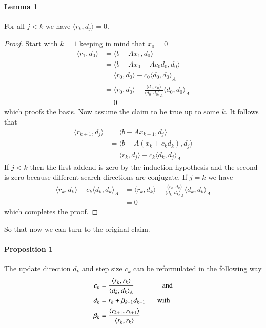 \documentclass[preprint,12pt,3p]{elsarticle}
\begin{document}
\paragraph{Lemma 1}
For all $j<k$ we have $\langle r_{k},d_j\rangle=0$.
\begin{proof}
Start with $k=1$ keeping in mind that $x_0=0$
\begin{align*}
    \langle r_{1},d_0\rangle&=\langle b-Ax_{1},d_0\rangle\\
    &=\langle b-Ax_0-Ac_0d_0,d_0\rangle\\
    &=\langle r_0,d_0\rangle-c_0\langle d_0,d_0\rangle_A\\
    &=\langle r_0,d_0\rangle-\frac{\langle d_0, r_0\rangle}{\langle d_0,d_0\rangle_A}\langle d_0,d_0\rangle_A\\
    &=0
\end{align*}
which proofs the basis. Now assume the claim to be true up to some $k$. It follows that
\begin{align*}
    \langle r_{k+1},d_j\rangle&=\langle b-Ax_{k+1},d_j\rangle\\
    &=\langle b-A(x_k+c_kd_k),d_j\rangle\\
    &=\langle r_k,d_j\rangle - c_k\langle d_k,d_j\rangle_A 
\end{align*}
If $j<k$ then the first addend is zero by the induction hypothesis and the second is zero because different search directions are conjugate. If $j=k$ we have
\begin{align*}
    \langle r_k,d_k\rangle - c_k\langle d_k,d_k\rangle_A&=\langle r_k,d_k\rangle - \frac{\langle r_k,d_k\rangle}{\langle d_k,d_k\rangle_A}\langle d_k,d_k\rangle_A\\
    &=0
\end{align*}
which completes the proof. 
\end{proof}

\noindent
So that now we can turn to the original claim.

\paragraph{Proposition 1} The update direction $d_k$ and step size $c_k$ can be reformulated in the following way
\begin{align*}
    c_k&=\frac{\langle r_k,r_k\rangle}{\langle d_k,d_k\rangle_A}\hspace{1.3 cm}\mbox{ and}\\
    d_{k}&=r_{k}+\beta_{k-1}d_{k-1}\hspace{0.5 cm}\mbox{ with}\\
    \beta_k&=\frac{\langle r_{k+1},r_{k+1}\rangle}{\langle r_k,r_k\rangle}
\end{align*}
\end{document}
